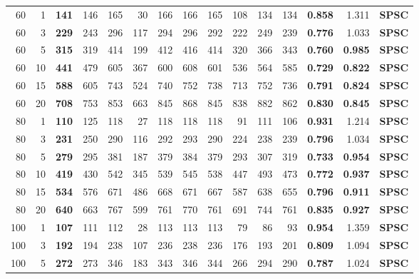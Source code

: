 \documentclass{article}
\begin{document}
\begin{table}[!htbp]
\begin{tabular}{rr|rrrrrrrrrr|rrl}
  \\
   60 &  1 &  \textbf{141} &  146 &  165 &   30 &  166 &  166 &  165 &  108 &  134 &  134 & \textbf{0.858} & 1.311 & \textbf{SPSC} \\
   60 &  3 &  \textbf{229} &  243 &  296 &  117 &  294 &  296 &  292 &  222 &  249 &  239 & \textbf{0.776} & 1.033 & \textbf{SPSC} \\
   60 &  5 &  \textbf{315} &  319 &  414 &  199 &  412 &  416 &  414 &  320 &  366 &  343 & \textbf{0.760} & \textbf{0.985} & \textbf{SPSC}
  \\
   60 & 10 &  \textbf{441} &  479 &  605 &  367 &  600 &  608 &  601 &  536 &  564 &  585 & \textbf{0.729} & \textbf{0.822} & \textbf{SPSC}
  \\
   60 & 15 &  \textbf{588} &  605 &  743 &  524 &  740 &  752 &  738 &  713 &  752 &  736 & \textbf{0.791} & \textbf{0.824} & \textbf{SPSC}
  \\
   60 & 20 &  \textbf{708} &  753 &  853 &  663 &  845 &  868 &  845 &  838 &  882 &  862 & \textbf{0.830} & \textbf{0.845} & \textbf{SPSC}
  \\
   80 &  1 &  \textbf{110} &  125 &  118 &   27 &  118 &  118 &  118 &   91 &  111 &  106 & \textbf{0.931} & 1.214 & \textbf{SPSC} \\
   80 &  3 &  \textbf{231} &  250 &  290 &  116 &  292 &  293 &  290 &  224 &  238 &  239 & \textbf{0.796} & 1.034 & \textbf{SPSC} \\
   80 &  5 &  \textbf{279} &  295 &  381 &  187 &  379 &  384 &  379 &  293 &  307 &  319 & \textbf{0.733} & \textbf{0.954} & \textbf{SPSC}
  \\
   80 & 10 &  \textbf{419} &  430 &  542 &  345 &  539 &  545 &  538 &  447 &  493 &  473 & \textbf{0.772} & \textbf{0.937} & \textbf{SPSC}
  \\
   80 & 15 &  \textbf{534} &  576 &  671 &  486 &  668 &  671 &  667 &  587 &  638 &  655 & \textbf{0.796} & \textbf{0.911} & \textbf{SPSC}
  \\
   80 & 20 &  \textbf{640} &  663 &  767 &  599 &  761 &  770 &  761 &  691 &  744 &  761 & \textbf{0.835} & \textbf{0.927} & \textbf{SPSC}
  \\
  100 &  1 &  \textbf{107} &  111 &  112 &   28 &  113 &  113 &  113 &   79 &   86 &   93 & \textbf{0.954} & 1.359 & \textbf{SPSC} \\
  100 &  3 &  \textbf{192} &  194 &  238 &  107 &  236 &  238 &  236 &  176 &  193 &  201 & \textbf{0.809} & 1.094 & \textbf{SPSC} \\
  100 &  5 &  \textbf{272} &  273 &  346 &  183 &  343 &  346 &  344 &  266 &  294 &  290 & \textbf{0.787} & 1.024 & \textbf{SPSC} \\

\end{tabular}
\end{table}
\end{document}

